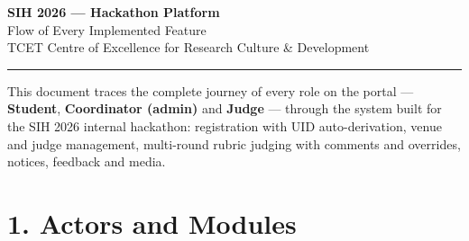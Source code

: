 \documentclass[11pt,a4paper]{article}
\begin{document}
\begin{center}
{\color{navy}\fontsize{26}{30}\selectfont\bfseries SIH 2026 --- Hackathon Platform}\\[2mm]
{\color{gold}\large Flow of Every Implemented Feature}\\[1mm]
{\color{navy!70}\normalsize TCET Centre of Excellence for Research Culture \& Development}
\end{center}
\vspace{2mm}

\noindent\rule{\textwidth}{0.6pt}
{\small This document traces the complete journey of every role on the portal --- \textbf{Student}, \textbf{Coordinator (admin)} and \textbf{Judge} --- through the system built for the SIH 2026 internal hackathon: registration with UID auto-derivation, venue and judge management, multi-round rubric judging with comments and overrides, notices, feedback and media.}

\section*{1. Actors and Modules}
\begin{center}
\end{center}
\end{document}
